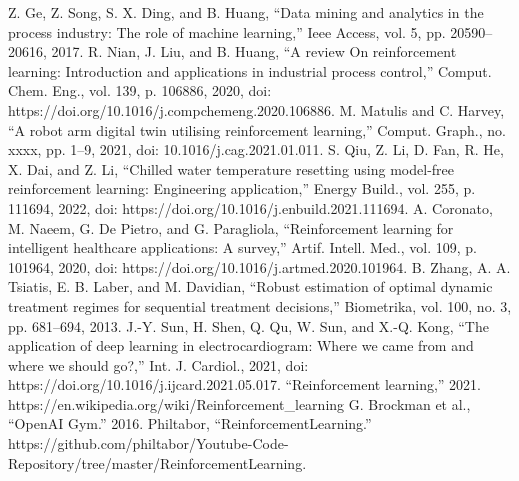 \documentclass[conference]{IEEEtran}
\begin{document}
\begin{thebibliography}{00}
 Z. Ge, Z. Song, S. X. Ding, and B. Huang, “Data mining and analytics in the process industry: The role of machine learning,” Ieee Access, vol. 5, pp. 20590–20616, 2017.
 R. Nian, J. Liu, and B. Huang, “A review On reinforcement learning: Introduction and applications in industrial process control,” Comput. Chem. Eng., vol. 139, p. 106886, 2020, doi: https://doi.org/10.1016/j.compchemeng.2020.106886. 
 M. Matulis and C. Harvey, “A robot arm digital twin utilising reinforcement learning,” Comput. Graph., no. xxxx, pp. 1–9, 2021, doi: 10.1016/j.cag.2021.01.011. 
 S. Qiu, Z. Li, D. Fan, R. He, X. Dai, and Z. Li, “Chilled water temperature resetting using model-free reinforcement learning: Engineering application,” Energy Build., vol. 255, p. 111694, 2022, doi: https://doi.org/10.1016/j.enbuild.2021.111694. 
 A. Coronato, M. Naeem, G. De Pietro, and G. Paragliola, “Reinforcement learning for intelligent healthcare applications: A survey,” Artif. Intell. Med., vol. 109, p. 101964, 2020, doi: https://doi.org/10.1016/j.artmed.2020.101964. 
 B. Zhang, A. A. Tsiatis, E. B. Laber, and M. Davidian, “Robust estimation of optimal dynamic treatment regimes for sequential treatment decisions,” Biometrika, vol. 100, no. 3, pp. 681–694, 2013. 
 J.-Y. Sun, H. Shen, Q. Qu, W. Sun, and X.-Q. Kong, “The application of deep learning in electrocardiogram: Where we came from and where we should go?,” Int. J. Cardiol., 2021, doi: https://doi.org/10.1016/j.ijcard.2021.05.017. 
 “Reinforcement learning,” 2021. \\  https://en.wikipedia.org/wiki/Reinforcement\_learning
 G. Brockman et al., “OpenAI Gym.” 2016.
 Philtabor, “ReinforcementLearning.” https://github.com/philtabor/Youtube-Code-Repository/tree/master/ReinforcementLearning. 
\end{thebibliography}
\end{document}
